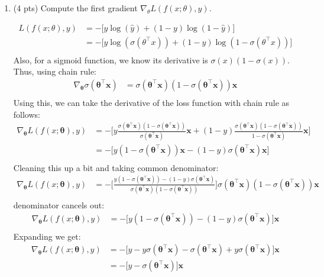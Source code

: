 \documentclass[a4paper]{article}
\theoremstyle{definition}
\newcommand{\vx}{\mathbf{x}}
\newcommand{\vtheta}{\mathbf{\theta}}
\newenvironment{soln}{
    \leavevmode\color{blue}\ignorespaces
}{}
\begin{document}
\begin{enumerate}
\begin{enumerate}
	\item (4 pts) Compute the first gradient $\nabla_{\theta} L(f(x;\theta), y)$.
	
	\begin{soln}
		\begin{align*}
		L(f(x;\theta), y) &= -\Big[y \log(\hat{y}) + (1-y) \log(1- \hat{y})\Big] \\
		&= -\Big[y \log(\sigma(\theta^\top x)) + (1-y) \log(1- \sigma(\theta^\top x))\Big] \\
		\end{align*}
		Also, for a sigmoid function, we know its derivative is $\sigma(x)(1-\sigma(x))$. Thus, using chain rule:
		\begin{align*}
			\nabla_{\vtheta} \sigma(\vtheta^\top \vx) &= \sigma(\vtheta^\top \vx)(1-\sigma(\vtheta^\top \vx))\vx \\
		\end{align*}
		Using this, we can take the derivative of the loss function with chain rule as follows:
		\begin{align*}
		\nabla_{\vtheta} L(f(x;\vtheta), y) &= -\Big[y \frac{\sigma(\vtheta^\top \vx)(1-\sigma(\vtheta^\top \vx))}{\sigma(\vtheta^\top \vx)}\vx + (1-y) \frac{\sigma(\vtheta^\top \vx)(1-\sigma(\vtheta^\top \vx))}{1-\sigma(\vtheta^\top \vx)}\vx\Big] \\
		&= -\Big[y (1-\sigma(\vtheta^\top \vx))\vx - (1-y) \sigma(\vtheta^\top \vx)\vx\Big] \\
		\end{align*}
		Cleaning this up a bit and taking common denominator:
		\begin{align*}
		\nabla_{\vtheta} L(f(x;\vtheta), y) &= -\Big[\frac {y (1-\sigma(\vtheta^\top \vx)) - (1-y) \sigma(\vtheta^\top \vx)}{\sigma(\vtheta^\top \vx)(1-\sigma(\vtheta^\top \vx))}\Big] \sigma(\vtheta^\top \vx)(1-\sigma(\vtheta^\top \vx))\vx \\
		\end{align*}
		denominator cancels out:
		\begin{align*}
		\nabla_{\vtheta} L(f(x;\vtheta), y) &= -\Big[y (1-\sigma(\vtheta^\top \vx)) - (1-y) \sigma(\vtheta^\top \vx)\Big] \vx \\
		\end{align*}
		Expanding we get:
		\begin{align*}
		\nabla_{\vtheta} L(f(x;\vtheta), y) &= -\Big[y - y\sigma(\vtheta^\top \vx) - \sigma(\vtheta^\top \vx) + y\sigma(\vtheta^\top \vx)\Big] \vx \\
		&= -\Big[y - \sigma(\vtheta^\top \vx)\Big] \vx \\
		\end{align*}
	\end{soln}
	

\end{enumerate}
\end{enumerate}
\end{document}
